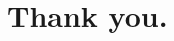 \documentclass[12pt, aspectratio=169]{beamer}
\begin{document}





    \section*{Thank you.}
\end{document}
